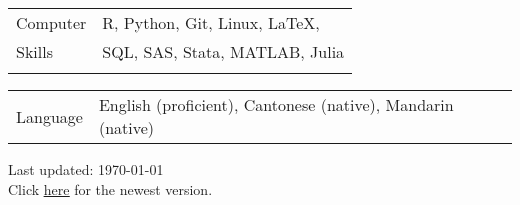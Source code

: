 \documentclass[letterpaper, 11pt]{article}
\begin{document}
\noindent \begin{tabular}{@{} p{3cm} l}
	\Large{Computer}  & R, Python, Git, Linux, \LaTeX,   \\
	\Large{Skills}    & SQL, SAS, Stata, MATLAB, Julia \\
	& \\
\end{tabular}





\noindent \begin{tabular}{@{} p{3cm} l}
	\Large{Language}  & English (proficient), Cantonese (native), Mandarin (native)   \\
\end{tabular}





\vspace{1cm}

\begin{center}
  \begin{footnotesize}
    Last updated: \today \\
    Click \href{https://jiachenghe.github.io/files/cv/CV.pdf}{\underline{here}} for the newest version.
  \end{footnotesize}
\end{center}
\end{document}
